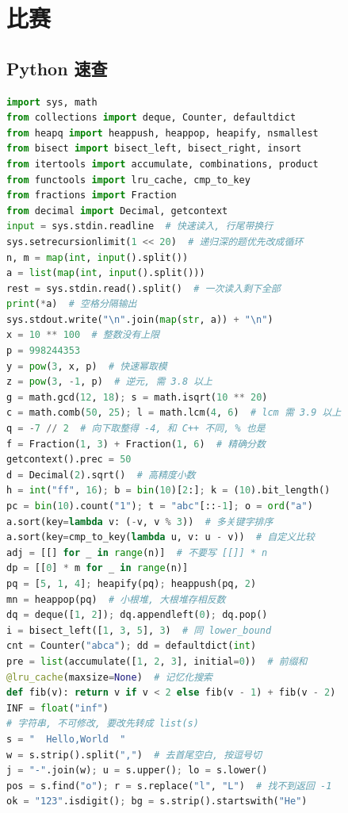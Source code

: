 \section{比赛}


\subsection{Python 速查}
\begin{lstlisting}[language=Python]
import sys, math
from collections import deque, Counter, defaultdict
from heapq import heappush, heappop, heapify, nsmallest
from bisect import bisect_left, bisect_right, insort
from itertools import accumulate, combinations, product
from functools import lru_cache, cmp_to_key
from fractions import Fraction
from decimal import Decimal, getcontext
input = sys.stdin.readline  # 快速读入, 行尾带换行
sys.setrecursionlimit(1 << 20)  # 递归深的题优先改成循环
n, m = map(int, input().split())
a = list(map(int, input().split()))
rest = sys.stdin.read().split()  # 一次读入剩下全部
print(*a)  # 空格分隔输出
sys.stdout.write("\n".join(map(str, a)) + "\n")
x = 10 ** 100  # 整数没有上限
p = 998244353
y = pow(3, x, p)  # 快速幂取模
z = pow(3, -1, p)  # 逆元, 需 3.8 以上
g = math.gcd(12, 18); s = math.isqrt(10 ** 20)
c = math.comb(50, 25); l = math.lcm(4, 6)  # lcm 需 3.9 以上
q = -7 // 2  # 向下取整得 -4, 和 C++ 不同, % 也是
f = Fraction(1, 3) + Fraction(1, 6)  # 精确分数
getcontext().prec = 50
d = Decimal(2).sqrt()  # 高精度小数
h = int("ff", 16); b = bin(10)[2:]; k = (10).bit_length()
pc = bin(10).count("1"); t = "abc"[::-1]; o = ord("a")
a.sort(key=lambda v: (-v, v % 3))  # 多关键字排序
a.sort(key=cmp_to_key(lambda u, v: u - v))  # 自定义比较
adj = [[] for _ in range(n)]  # 不要写 [[]] * n
dp = [[0] * m for _ in range(n)]
pq = [5, 1, 4]; heapify(pq); heappush(pq, 2)
mn = heappop(pq)  # 小根堆, 大根堆存相反数
dq = deque([1, 2]); dq.appendleft(0); dq.pop()
i = bisect_left([1, 3, 5], 3)  # 同 lower_bound
cnt = Counter("abca"); dd = defaultdict(int)
pre = list(accumulate([1, 2, 3], initial=0))  # 前缀和
@lru_cache(maxsize=None)  # 记忆化搜索
def fib(v): return v if v < 2 else fib(v - 1) + fib(v - 2)
INF = float("inf")
# 字符串, 不可修改, 要改先转成 list(s)
s = "  Hello,World  "
w = s.strip().split(",")  # 去首尾空白, 按逗号切
j = "-".join(w); u = s.upper(); lo = s.lower()
pos = s.find("o"); r = s.replace("l", "L")  # 找不到返回 -1
ok = "123".isdigit(); bg = s.strip().startswith("He")

\end{lstlisting}
